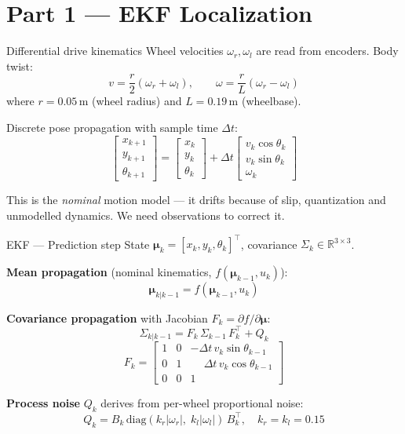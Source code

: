\documentclass[10pt,aspectratio=169]{beamer}
\begin{document}
\section{Part 1 — EKF Localization}

\begin{frame}{Differential drive kinematics}
  Wheel velocities $\omega_r, \omega_l$ are read from encoders. Body twist:
  \[
    v = \frac{r}{2}(\omega_r + \omega_l), \qquad
    \omega = \frac{r}{L}(\omega_r - \omega_l)
  \]
  where $r=0.05\,\text{m}$ (wheel radius) and $L=0.19\,\text{m}$ (wheelbase).

  \medskip
  Discrete pose propagation with sample time $\Delta t$:
  \[
    \begin{bmatrix} x_{k+1} \\ y_{k+1} \\ \theta_{k+1}\end{bmatrix}
    = \begin{bmatrix} x_k \\ y_k \\ \theta_k\end{bmatrix}
    + \Delta t \begin{bmatrix} v_k\cos\theta_k \\ v_k\sin\theta_k \\ \omega_k\end{bmatrix}
  \]

  \medskip
  This is the \emph{nominal} motion model — it drifts because of slip, quantization
  and unmodelled dynamics. We need observations to correct it.
\end{frame}

\begin{frame}{EKF — Prediction step}
  State $\bm{\mu}_k = [x_k, y_k, \theta_k]^\top$, covariance $\Sigma_k \in \mathbb{R}^{3\times 3}$.

  \medskip
  \textbf{Mean propagation} (nominal kinematics, $f(\bm{\mu}_{k-1}, u_k)$):
  \[
    \bm{\mu}_{k|k-1} = f(\bm{\mu}_{k-1}, u_k)
  \]

  \textbf{Covariance propagation} with Jacobian $F_k = \partial f/\partial \bm{\mu}$:
  \[
    \Sigma_{k|k-1} = F_k\, \Sigma_{k-1}\, F_k^\top + Q_k
  \]
  \[
    F_k = \begin{bmatrix}
      1 & 0 & -\Delta t\, v_k \sin\theta_{k-1} \\
      0 & 1 & \phantom{-}\Delta t\, v_k \cos\theta_{k-1} \\
      0 & 0 & 1
    \end{bmatrix}
  \]

  \textbf{Process noise} $Q_k$ derives from per-wheel proportional noise:
  \[
    Q_k = B_k\, \mathrm{diag}(k_r |\omega_r|,\; k_l |\omega_l|)\, B_k^\top,
    \quad k_r = k_l = 0.15
  \]
\end{frame}
\end{document}
